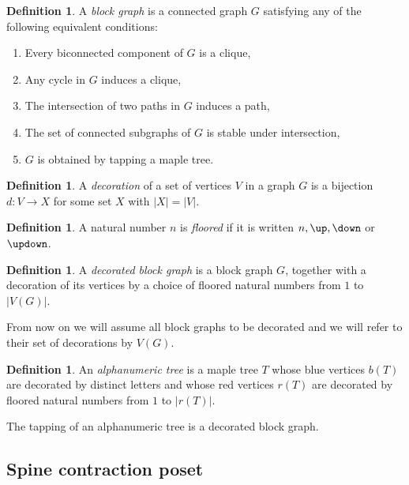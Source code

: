 \documentclass{amsart}
\theoremstyle{definition}
\newtheorem{definition}[theorem]{Definition}
\begin{document}
\begin{definition}
  \label{def:blockgraph}
  A \emph{block graph} is a connected graph $G$ satisfying any of the following equivalent conditions:
  \begin{enumerate}
    \item Every biconnected component of $G$ is a clique,
    \item Any cycle in $G$ induces a clique,
    \item The intersection of two paths in $G$ induces a path,
    \item The set of connected subgraphs of $G$ is stable under intersection,
    \item $G$ is obtained by tapping a maple tree.
  \end{enumerate}
\end{definition}

\begin{definition}
  A \emph{decoration} of a set of vertices $V$ in a graph $G$ is a bijection $d : V \to X$ for some set $X$ with $|X|=|V|$. 
\end{definition}

\begin{definition}
  A natural number $n$ is \emph{floored} if it is written $n, \up, \down$ or $\updown$.
\end{definition}

\begin{definition}
A \emph{decorated block graph} is a block graph $G$, together with a decoration of its vertices by a choice of floored natural numbers from $1$ to $|V(G)|$.
\end{definition}

From now on we will assume all block graphs to be decorated and we will refer to their set of decorations by $V(G)$.

\begin{definition}
  An \emph{alphanumeric tree} is a maple tree $T$ whose blue vertices $b(T)$ are decorated by distinct letters and whose red vertices $r(T)$ are decorated by floored natural numbers from $1$ to $|r(T)|$.
\end{definition}

The tapping of an alphanumeric tree is a decorated block graph. 


\subsection{Spine contraction poset}
\end{document}
